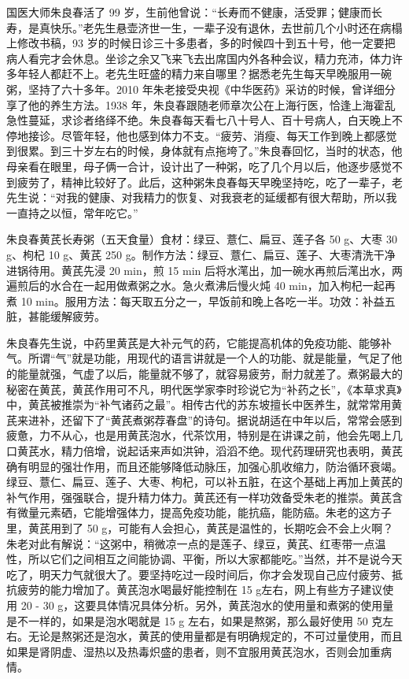 国医大师朱良春活了 99 岁，生前他曾说：“长寿而不健康，活受罪；健康而长寿，是真快乐。”老先生悬壶济世一生，一辈子没有退休，去世前几个小时还在病榻上修改书稿，93 岁的时候日诊三十多患者，多的时候四十到五十号，他一定要把病人看完才会休息。坐诊之余又飞来飞去出席国内外各种会议，精力充沛，体力许多年轻人都赶不上。老先生旺盛的精力来自哪里？据悉老先生每天早晚服用一碗粥，坚持了六十多年。2010 年朱老接受央视《中华医药》采访的时候，曾详细分享了他的养生方法。1938 年，朱良春跟随老师章次公在上海行医，恰逢上海霍乱急性蔓延，求诊者络绎不绝。朱良春每天看七八十号人、百十号病人，白天晚上不停地接诊。尽管年轻，他也感到体力不支。“疲劳、消瘦、每天工作到晚上都感觉到很累。到三十岁左右的时候，身体就有点拖垮了。”朱良春回忆，当时的状态，他母亲看在眼里，母子俩一合计，设计出了一种粥，吃了几个月以后，他逐步感觉不到疲劳了，精神比较好了。此后，这种粥朱良春每天早晚坚持吃，吃了一辈子，老先生说：“对我的健康、对我精力的恢复、对我衰老的延缓都有很大帮助，所以我一直持之以恒，常年吃它。”

朱良春黄芪长寿粥（五天食量）食材：绿豆、薏仁、扁豆、莲子各 50 \unit{\g}、大枣 30 \unit{\g}、枸杞 10 \unit{\g}、黄芪 250 \unit{\g}。制作方法：绿豆、薏仁、扁豆、莲子、大枣清洗干净进锅待用。黄芪先浸 20 \unit{\minute}，煎 15 \unit{\minute} 后将水滗出，加一碗水再煎后滗出水，两遍煎后的水合在一起用做煮粥之水。急火煮沸后慢火炖 40 \unit{\minute}，加入枸杞一起再煮 10 \unit{\minute}。服用方法：每天取五分之一，早饭前和晚上各吃一半。功效：补益五脏，甚能缓解疲劳。

朱良春先生说，中药里黄芪是大补元气的药，它能提高机体的免疫功能、能够补气。所谓“气”就是功能，用现代的语言讲就是一个人的功能、就是能量，气足了他的能量就强，气虚了以后，能量就不够了，就容易疲劳，耐力就差了。煮粥最大的秘密在黄芪，黄芪作用可不凡，明代医学家李时珍说它为“补药之长”，《本草求真》中，黄芪被推崇为“补气诸药之最”。相传古代的苏东坡擅长中医养生，就常常用黄芪来进补，还留下了“黄芪煮粥荐春盘”的诗句。据说胡适在中年以后，常常会感到疲惫，力不从心，也是用黄芪泡水，代茶饮用，特别是在讲课之前，他会先喝上几口黄芪水，精力倍增，说起话来声如洪钟，滔滔不绝。现代药理研究也表明，黄芪确有明显的强壮作用，而且还能够降低动脉压，加强心肌收缩力，防治循环衰竭。绿豆、薏仁、扁豆、莲子、大枣、枸杞，可以补五脏，在这个基础上再加上黄芪的补气作用，强强联合，提升精力体力。黄芪还有一样功效备受朱老的推崇。黄芪含有微量元素硒，它能增强体力，提高免疫功能，能抗癌，能防癌。朱老的这方子里，黄芪用到了 50 \unit{\g}，可能有人会担心，黄芪是温性的，长期吃会不会上火啊？朱老对此有解说：“这粥中，稍微凉一点的是莲子、绿豆，黄芪、红枣带一点温性，所以它们之间相互之间能协调、平衡，所以大家都能吃。”当然，并不是说今天吃了，明天力气就很大了。要坚持吃过一段时间后，你才会发现自己应付疲劳、抵抗疲劳的能力增加了。黄芪泡水喝最好能控制在 15 \unit{\g}左右，网上有些方子建议使用 20 - 30 \unit{\g}，这要具体情况具体分析。另外，黄芪泡水的使用量和煮粥的使用量是不一样的，如果是泡水喝就是 15 \unit{\g} 左右，如果是熬粥，那么最好使用 50 克左右。无论是熬粥还是泡水，黄芪的使用量都是有明确规定的，不可过量使用，而且如果是肾阴虚、湿热以及热毒炽盛的患者，则不宜服用黄芪泡水，否则会加重病情。

